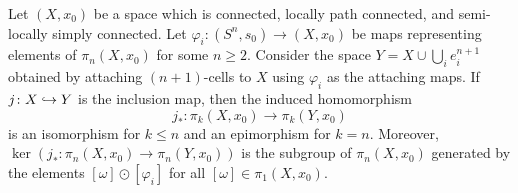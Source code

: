 \begin{proposition}
Let $(X, x_{0})$ be a space which is connected, locally path connected, and semi-locally 
simply connected. Let 
$\varphi_{i}\colon (S^{n}, s_{0}) \to (X, x_{0})$ be maps representing  elements of 
$\pi_{n}(X, x_{0})$ for some $n\geq 2$. Consider the space $Y = X\cup \bigcup_{i} e_{i}^{n+1}$ 
obtained by attaching $(n+1)$-cells to $X$ using $\varphi_{i}$ 
as the attaching maps. If $j\colon X \hookrightarrow Y$ is the inclusion map, then the induced homomorphism 
\[
j_{\ast}\colon \pi_{k}(X, x_{0}) \to \pi_{k}(Y, x_{0})
\]
is an isomorphism for $k\leq n$ and an epimorphism for $k=n$. Moreover, 
$\ker(j_{\ast}\colon \pi_{n}(X, x_{0}) \to \pi_{n}(Y, x_{0}))$ is the subgroup of 
$\pi_{n}(X, x_{0})$ generated by the elements 
$[\omega]\odot[\varphi_{i}]$ for all $[\omega]\in \pi_{1}(X, x_{0})$.
\end{proposition}

